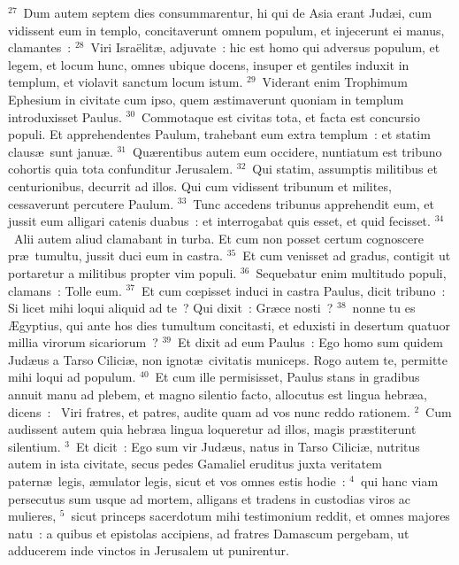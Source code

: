${}^{27}$~Dum autem septem dies consummarentur, hi qui de Asia erant Jud\ae i, cum vidissent eum in templo, concitaverunt omnem populum, et injecerunt ei manus, clamantes~:
${}^{28}$~Viri Isra\"elit\ae , adjuvate~: hic est homo qui adversus populum, et legem, et locum hunc, omnes ubique docens, insuper et gentiles induxit in templum, et violavit sanctum locum istum.
${}^{29}$~Viderant enim Trophimum Ephesium in civitate cum ipso, quem \ae stimaverunt quoniam in templum introduxisset Paulus.
${}^{30}$~Commotaque est civitas tota, et facta est concursio populi. Et apprehendentes Paulum, trahebant eum extra templum~: et statim claus\ae\ sunt janu\ae .
${}^{31}$~Qu\ae rentibus autem eum occidere, nuntiatum est tribuno cohortis quia tota confunditur Jerusalem.
${}^{32}$~Qui statim, assumptis militibus et centurionibus, decurrit ad illos. Qui cum vidissent tribunum et milites, cessaverunt percutere Paulum.
${}^{33}$~Tunc accedens tribunus apprehendit eum, et jussit eum alligari catenis duabus~: et interrogabat quis esset, et quid fecisset.
${}^{34}$~Alii autem aliud clamabant in turba. Et cum non posset certum cognoscere pr\ae\ tumultu, jussit duci eum in castra.
${}^{35}$~Et cum venisset ad gradus, contigit ut portaretur a militibus propter vim populi.
${}^{36}$~Sequebatur enim multitudo populi, clamans~: Tolle eum.
${}^{37}$~Et cum cœpisset induci in castra Paulus, dicit tribuno~: Si licet mihi loqui aliquid ad te~? Qui dixit~: Gr\ae ce nosti~?
${}^{38}$~nonne tu es \AE gyptius, qui ante hos dies tumultum concitasti, et eduxisti in desertum quatuor millia virorum sicariorum~?
${}^{39}$~Et dixit ad eum Paulus~: Ego homo sum quidem Jud\ae us a Tarso Cilici\ae , non ignot\ae\ civitatis municeps. Rogo autem te, permitte mihi loqui ad populum.
${}^{40}$~Et cum ille permisisset, Paulus stans in gradibus annuit manu ad plebem, et magno silentio facto, allocutus est lingua hebr\ae a, dicens~:
~Viri fratres, et patres, audite quam ad vos nunc reddo rationem.
${}^{2}$~Cum audissent autem quia hebr\ae a lingua loqueretur ad illos, magis pr\ae stiterunt silentium.
${}^{3}$~Et dicit~: Ego sum vir Jud\ae us, natus in Tarso Cilici\ae , nutritus autem in ista civitate, secus pedes Gamaliel eruditus juxta veritatem patern\ae\ legis, \ae mulator legis, sicut et vos omnes estis hodie~:
${}^{4}$~qui hanc viam persecutus sum usque ad mortem, alligans et tradens in custodias viros ac mulieres,
${}^{5}$~sicut princeps sacerdotum mihi testimonium reddit, et omnes majores natu~: a quibus et epistolas accipiens, ad fratres Damascum pergebam, ut adducerem inde vinctos in Jerusalem ut punirentur.

